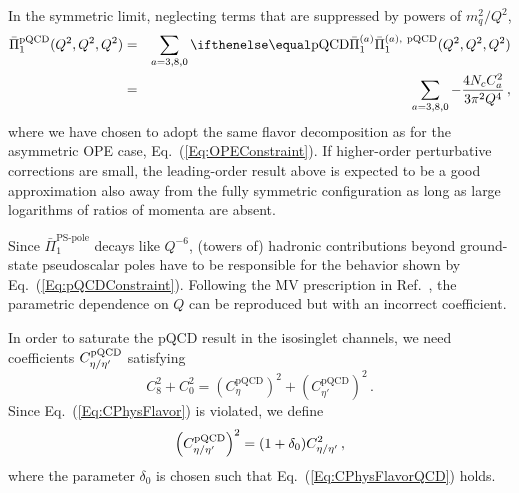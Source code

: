 In the symmetric limit, neglecting terms that are suppressed by powers of $m_q^2/Q^2$,
\begin{eqnarray}
\bar{\Pi}_1^\text{pQCD} (Q^2, Q^2, Q^2) & = & \sum_{a={3,8,0}} \PiPS[\text{pQCD}](Q^2, Q^2, Q^2) \nonumber \\
& = & \sum_{a={3,8,0}} -  \frac{4 N_c C_a^2}{3 \pi^2 Q^4}\, ,
\label{Eq:pQCDConstraint}
\end{eqnarray}
where we have chosen to adopt the same flavor decomposition as for the asymmetric OPE case, Eq.~(\ref{Eq:OPEConstraint}). If higher-order perturbative corrections are small, the leading-order result above is expected to be a good approximation also away from the fully symmetric configuration as long as large logarithms of ratios of momenta are absent.

Since $\bar{\Pi}_1^\text{PS-pole}$ decays like $Q^{-6}$, (towers of) ha\-dro\-nic contributions beyond ground-state pseudoscalar poles have to be responsible for the behavior shown by Eq.~(\ref{Eq:pQCDConstraint}). Following the MV prescription in Ref.~\cite{MV}, the parametric dependence on $Q$ can be reproduced but with an incorrect coefficient.

In order to saturate the pQCD result in the isosinglet channels, we need coefficients $C_{{\eta / \eta'}}^\text{pQCD}$ satisfying 
\begin{equation}
C_8^2 + C_0^2 = \left(C^\text{pQCD}_{\eta}\right)^2 + \left(C^\text{pQCD}_{{\eta'}}\right)^2\,.
\label{Eq:CPhysFlavorQCD}
\end{equation}
Since Eq.~(\ref{Eq:CPhysFlavor}) is violated, we define
\begin{equation}
\left(C_{{\eta / \eta'}}^\text{pQCD}\right)^2 = (1 + \delta_0) C_{{\eta / \eta'}}^2\, ,
\label{Eq:delta0}
\end{equation}
where the parameter $\delta_0$ is chosen such that Eq.~(\ref{Eq:CPhysFlavorQCD}) holds.